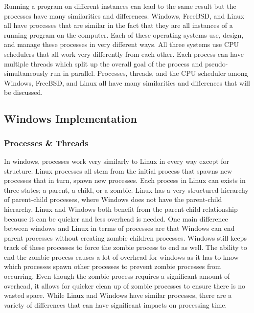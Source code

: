 \documentclass[draftclsnofoot, onecolumn, compsoc, 10pt]{IEEEtran}
\begin{document}
Running a program on different instances can lead to the same result but the processes have many similarities and differences. Windows, FreeBSD, and Linux all have processes that are similar in the fact that they are all instances of a running program on the computer. Each of these operating systems use, design, and manage these processes in very different ways. All three systems use CPU schedulers that all work very differently from each other. Each process can have multiple threads which split up the overall goal of the process and pseudo-simultaneously run in parallel. Processes, threads, and the CPU scheduler among Windows, FreeBSD, and Linux all have many similarities and differences that will be discussed.

\subsection{Windows Implementation}
\subsubsection{Processes \& Threads}

In windows, processes work very similarly to Linux in every way except for structure. Linux processes all stem from the initial process that spawns new processes that in turn, spawn new processes. Each process in Linux can exists in three states; a parent, a child, or a zombie. Linux has a very structured hierarchy of parent-child processes, where Windows does not have the parent-child hierarchy. Linux and Windows both benefit from the parent-child relationship because it can be quicker and less overhead is needed. One main difference between windows and Linux in terms of processes are that Windows can end parent processes without creating zombie children processes. Windows still keeps track of these processes to force the zombie process to end as well. The ability to end the zombie process causes a lot of overhead for windows as it has to know which processes spawn other processes to prevent zombie processes from occurring. Even though the zombie process requires a significant amount of overhead, it allows for quicker clean up of zombie processes to ensure there is no wasted space. While Linux and Windows have similar processes, there are a variety of differences that can have significant impacts on processing time. 
\end{document}
